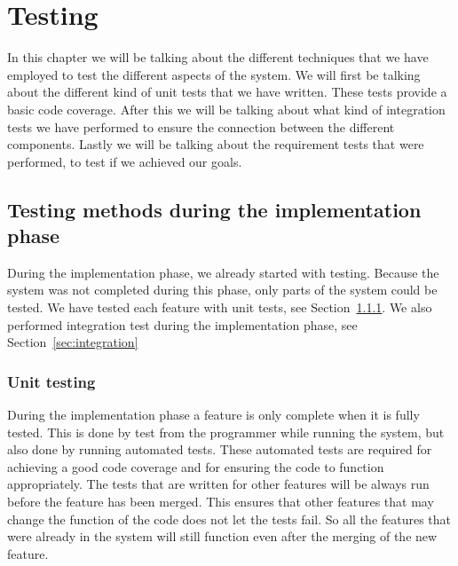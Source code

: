 \chapter{Testing}
\label{sec:testing}
In this chapter we will be talking about the different techniques that we have employed to test the different aspects of the system.
We will first be talking about the different kind of unit tests that we have written.
These tests provide a basic code coverage.
After this we will be talking about what kind of integration tests we have performed to ensure the connection between the different components.
Lastly we will be talking about the requirement tests that were performed, to test if we achieved our goals.

\section{Testing methods during the implementation phase}
During the implementation phase, we already started with testing.
Because the system was not completed during this phase, only parts of the system could be tested.
We have tested each feature with unit tests, see Section~\ref{sec:unit_test}.
We also performed integration test during the implementation phase, see Section~\ref{sec:integration}

\subsection{Unit testing}
\label{sec:unit_test}
During the implementation phase a feature is only complete when it is fully tested.
This is done by test from the programmer while running the system, but also done by running automated tests.
These automated tests are required for achieving a good code coverage and for ensuring the code to function appropriately.
The tests that are written for other features will be always run before the feature has been merged.
This ensures that other features that may change the function of the code does not let the tests fail.
So all the features that were already in the system will still function even after the merging of the new feature.

